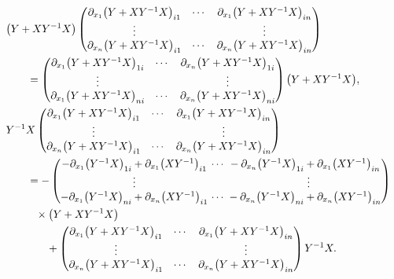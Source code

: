 \documentclass[pdftex]{sigma}
\numberwithin{equation}{section}
\begin{document}
\begin{align}
\\
& \bigl(Y+XY^{-1}X\bigr)
\begin{pmatrix}
\partial_{x_1}\bigl(Y+XY^{-1}X\bigr)_{i1} & \cdots & \partial_{x_1}\bigl(Y+XY^{-1}X\bigr)_{in} \\
\vdots & & \vdots \\
\partial_{x_n}\bigl(Y+XY^{-1}X\bigr)_{i1} & \cdots & \partial_{x_n}\bigl(Y+XY^{-1}X\bigr)_{in}
\end{pmatrix}\nonumber \\
&\qquad=
\begin{pmatrix}
\partial_{x_1}\bigl(Y+XY^{-1}X\bigr)_{1i} & \cdots & \partial_{x_n}\bigl(Y+XY^{-1}X\bigr)_{1i} \\
\vdots & & \vdots \\
\partial_{x_1}\bigl(Y+XY^{-1}X\bigr)_{ni} & \cdots & \partial_{x_n}\bigl(Y+XY^{-1}X\bigr)_{ni}
\end{pmatrix}
\bigl(Y+XY^{-1}X\bigr),\label{K7}
\\
&Y^{-1}X
\begin{pmatrix}
\partial_{x_1}\bigl(Y+XY^{-1}X\bigr)_{i1} & \cdots & \partial_{x_1}\bigl(Y+XY^{-1}X\bigr)_{in} \\
\vdots & & \vdots \\
\partial_{x_n}\bigl(Y+XY^{-1}X\bigr)_{i1} & \cdots & \partial_{x_n}\bigl(Y+XY^{-1}X\bigr)_{in}
\end{pmatrix}\nonumber\\
&\qquad= -
\begin{pmatrix}
 - \partial_{x_1}\bigl(Y^{-1}X\bigr)_{1i} + \partial_{x_1}\bigl(XY^{-1}\bigr)_{i1} & {\hspace*{-3mm}}\cdots & {\hspace*{-3mm}}- \partial_{x_n}\bigl(Y^{-1}X\bigr)_{1i} + \partial_{x_1}\bigl(XY^{-1}\bigr)_{in} \\
\vdots & & \vdots \\
 - \partial_{x_1}\bigl(Y^{-1}X\bigr)_{ni} + \partial_{x_n}\bigl(XY^{-1}\bigr)_{i1} & {\hspace*{-3mm}}\cdots & {\hspace*{-3mm}}- \partial_{x_n}\bigl(Y^{-1}X\bigr)_{ni} + \partial_{x_n}\bigl(XY^{-1}\bigr)_{in}
\end{pmatrix}
\nonumber \\
&\phantom{\qquad=}{}\times \bigl(Y + XY^{-1}X\bigr)\nonumber\\
&\phantom{\qquad=\times}{}+
\begin{pmatrix}
\partial_{x_1}\bigl(Y+XY^{-1}X\bigr)_{i1} & \cdots & \partial_{x_1}\bigl(Y+XY^{-1}X\bigr)_{in} \\
\vdots & & \vdots \\
\partial_{x_n}\bigl(Y+XY^{-1}X\bigr)_{i1} & \cdots & \partial_{x_n}\bigl(Y+XY^{-1}X\bigr)_{in}
\end{pmatrix}
Y^{-1}X.\label{K8}
\end{align}
\end{document}
